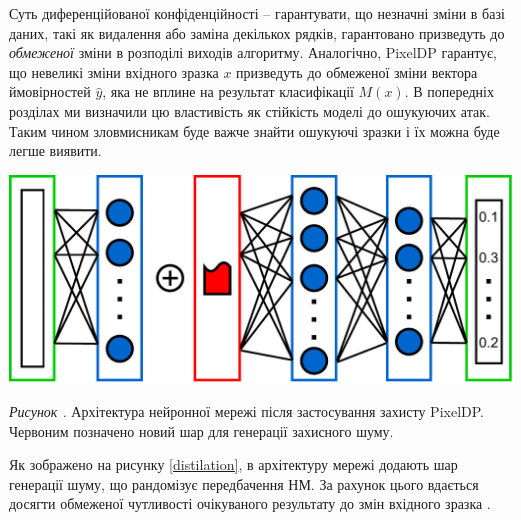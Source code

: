 \documentclass[14pt,a4paper]{extarticle}
\newcounter{e}
\newcounter{pic}
\newcommand{\pic}[1]{\refstepcounter{pic} \vspace{-0.3cm}\textit{Рисунок \arabic{pic}\label{#1}.}}
\numberwithin{equation}{section}
\numberwithin{figure}{section}
\begin{document}
 Суть диференційованої конфіденційності -- гарантувати, що незначні зміни в базі даних, такі як видалення або заміна декількох рядків, гарантовано призведуть до \textit{обмеженої} зміни в розподілі виходів алгоритму. Аналогічно, PixelDP гарантує, що невеликі зміни вхідного зразка $x$ призведуть до обмеженої зміни вектора ймовірностей $\hat{y}$, яка не вплине на результат класифікації $M(x)$. В попередніх розділах ми визначили цю властивість як стійкість моделі до ошукуючих атак. Таким чином зловмисникам буде важче знайти ошукуючі зразки і їх можна буде легше виявити.
 
 \begin{center}
 	\includegraphics[width=14cm]{../images/diagrams-PixelDP-small.pdf}
 \end{center}
 \begin{center}
 	\pic{distilation} Архітектура нейронної мережі після застосування захисту PixelDP. Червоним позначено новий шар для генерації захисного шуму.
 \end{center}
 
 Як зображено на рисунку \ref{distilation}, в архітектуру мережі додають шар генерації шуму, що рандомізує передбачення НМ. За рахунок цього вдається досягти обмеженої чутливості очікуваного результату до змін вхідного зразка \cite{pixeldp}.
 

 
\end{document}

